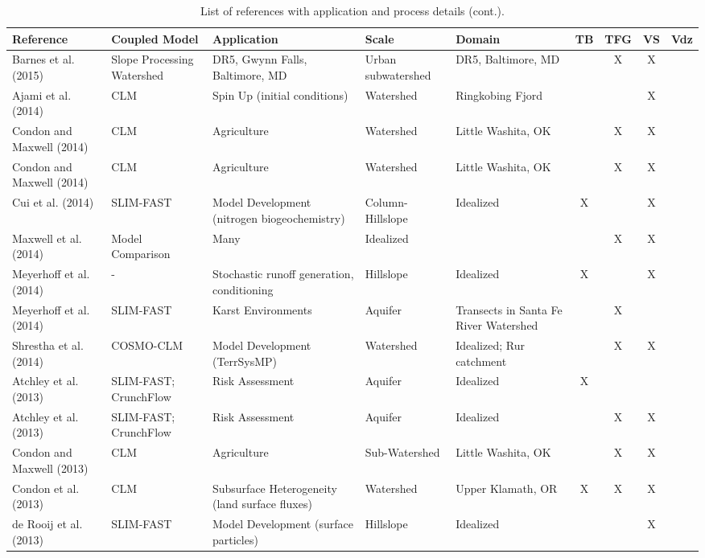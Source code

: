 {\begin{table} \center
\renewcommand{\arraystretch}{2.5}
\center
\caption{List of \parflow{} references with application and process details (cont.).}

\begin{tabular}{ l  p{1.5cm} p{2cm} p{1.5cm} p{1.5cm} | c | c | c | c }
\bf{Reference} & \bf{Coupled Model} & \bf{Application} & \bf{Scale} & \bf{Domain} & \bf{TB} & \bf{TFG} & \bf{VS} & \bf{Vdz} \\   
\hline{}

\cite{Barnes2015} Barnes et al. (2015)& Slope Processing Watershed & DR5, Gwynn Falls, Baltimore, MD  & Urban subwatershed & DR5, Baltimore, MD &  &X & X & \\	
\cite{Ajami14} Ajami et al. (2014) & CLM & Spin Up (initial conditions) & Watershed & Ringkobing Fjord &   &   & X &     \\
\cite{Condon14a} Condon and Maxwell (2014) & CLM & Agriculture & Watershed & Little Washita, OK &   & X & X &     \\
\cite{Condon14b} Condon and Maxwell (2014) & CLM & Agriculture & Watershed & Little Washita, OK &  & X& X &     \\
\cite{Cui14} Cui et al. (2014) & SLIM-FAST & Model Development (nitrogen biogeochemistry) & Column-Hillslope & Idealized & X &   & X &     \\
\cite{M14} Maxwell et al. (2014) & Model Comparison & Many  & Idealized  &   &   & X & X &     \\ 
\cite{Meyerhoff14a} Meyerhoff et al. (2014) & - & Stochastic runoff generation, conditioning & Hillslope & Idealized & X &   & X &     \\
\cite{Meyerhoff14b} Meyerhoff et al. (2014) & SLIM-FAST & Karst Environments & Aquifer & Transects in Santa Fe River Watershed &   & X &   &       \\
\cite{Shrestha14} Shrestha et al. (2014) & COSMO-CLM & Model Development (TerrSysMP) & Watershed & Idealized; Rur catchment &   & X & X &     \\
\cite{Atchley13a} Atchley et al. (2013) & SLIM-FAST; CrunchFlow & Risk Assessment & Aquifer & Idealized & X &   &   &     \\ 
\cite{Atchley13b} Atchley et al. (2013) & SLIM-FAST; CrunchFlow & Risk Assessment & Aquifer & Idealized &   & X & X &     \\
\cite{Condon13a} Condon and Maxwell (2013) & CLM & Agriculture & Sub-Watershed & Little Washita, OK &   & X & X &     \\
\cite{Condon13b} Condon et al. (2013) & CLM & Subsurface Heterogeneity (land surface fluxes) & Watershed & Upper Klamath, OR & X & X & X &     \\
\cite{deRooij13} de Rooij et al. (2013) & SLIM-FAST & Model Development (surface particles) & Hillslope & Idealized  &   &   & X &     \\
\end{tabular}
\label{pfref3}
\end{table}

}
